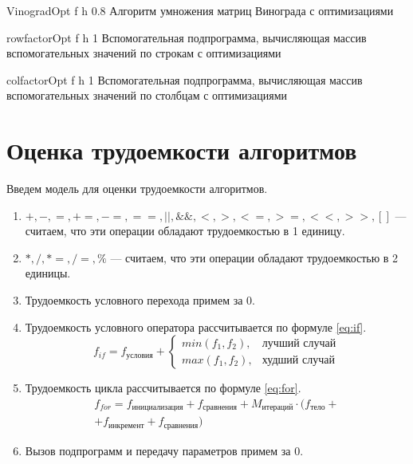 {VinogradOpt} %
{f} %
{h} %
{0.8\textwidth} %
{Алгоритм умножения матриц Винограда с оптимизациями} %

{rowfactorOpt} %
{f} %
{h} %
{1\textwidth} %
{Вспомогательная подпрограмма, вычисляющая массив вспомогательных значений по строкам с оптимизациями} %

{colfactorOpt} %
{f} %
{h} %
{1\textwidth} %
{Вспомогательная подпрограмма, вычисляющая массив вспомогательных значений по столбцам с оптимизациями} %

\clearpage

\section{Оценка трудоемкости алгоритмов}

Введем модель для оценки трудоемкости алгоритмов.
\begin{enumerate}
	\item $+, -, =, +=, -=, ==, ||, \&\&, <, >, <=, >=, <<, >>, []$ --- считаем, что эти операции обладают трудоемкостью в 1 единицу.
	\item $*, /, *=, /=, \% $ --- считаем, что эти операции обладают трудоемкостью в 2 единицы.
	\item Трудоемкость условного перехода примем за $0$.
	\item Трудоемкость условного оператора рассчитывается по формуле \eqref{eq:if}. 
	\begin{equation}
		\label{eq:if}
		f_{if} = f_{\text{условия}} + 
		\begin{cases}
			min(f_1, f_2), & \text{лучший случай}\\
			max(f_1, f_2), & \text{худший случай}
		\end{cases}
	\end{equation}
	\item Трудоемкость цикла рассчитывается по формуле \eqref{eq:for}.
	\begin{equation}
		\label{eq:for}
		\begin{gathered}
			f_{for} = f_{\text{инициализация}} + f_{\text{сравнения}} + M_{\text{итераций}} \cdot (f_{\text{тело}} +\\
			+ f_{\text{инкремент}} + f_{\text{сравнения}})
		\end{gathered}
	\end{equation}
	\item Вызов подпрограмм и передачу параметров примем за $0$.
\end{enumerate}

